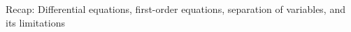 \documentclass[preview]{standalone}
\begin{document}
\begin{center}
Recap: Differential equations, first-order equations, separation of variables, and its limitations
\end{center}
\end{document}

